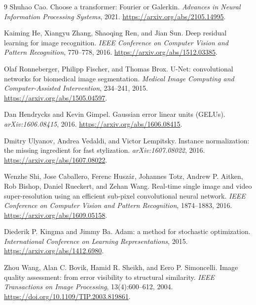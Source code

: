 \documentclass[11pt]{article}
\begin{document}
\begin{thebibliography}{9}
Shuhao Cao.
\newblock Choose a transformer: Fourier or Galerkin.
\newblock \emph{Advances in Neural Information Processing Systems}, 2021.
\newblock \url{https://arxiv.org/abs/2105.14995}.

Kaiming He, Xiangyu Zhang, Shaoqing Ren, and Jian Sun.
\newblock Deep residual learning for image recognition.
\newblock \emph{IEEE Conference on Computer Vision and Pattern Recognition},
770--778, 2016.
\newblock \url{https://arxiv.org/abs/1512.03385}.

Olaf Ronneberger, Philipp Fischer, and Thomas Brox.
\newblock U-Net: convolutional networks for biomedical image segmentation.
\newblock \emph{Medical Image Computing and Computer-Assisted Intervention},
234--241, 2015.
\newblock \url{https://arxiv.org/abs/1505.04597}.

Dan Hendrycks and Kevin Gimpel.
\newblock Gaussian error linear units (GELUs).
\newblock \emph{arXiv:1606.08415}, 2016.
\newblock \url{https://arxiv.org/abs/1606.08415}.

Dmitry Ulyanov, Andrea Vedaldi, and Victor Lempitsky.
\newblock Instance normalization: the missing ingredient for fast stylization.
\newblock \emph{arXiv:1607.08022}, 2016.
\newblock \url{https://arxiv.org/abs/1607.08022}.

Wenzhe Shi, Jose Caballero, Ferenc Husz\'ar, Johannes Totz, Andrew P. Aitken,
Rob Bishop, Daniel Rueckert, and Zehan Wang.
\newblock Real-time single image and video super-resolution using an efficient
sub-pixel convolutional neural network.
\newblock \emph{IEEE Conference on Computer Vision and Pattern Recognition},
1874--1883, 2016.
\newblock \url{https://arxiv.org/abs/1609.05158}.

Diederik P. Kingma and Jimmy Ba.
\newblock Adam: a method for stochastic optimization.
\newblock \emph{International Conference on Learning Representations}, 2015.
\newblock \url{https://arxiv.org/abs/1412.6980}.

Zhou Wang, Alan C. Bovik, Hamid R. Sheikh, and Eero P. Simoncelli.
\newblock Image quality assessment: from error visibility to structural
similarity.
\newblock \emph{IEEE Transactions on Image Processing}, 13(4):600--612, 2004.
\newblock \url{https://doi.org/10.1109/TIP.2003.819861}.

\end{thebibliography}
\end{document}
